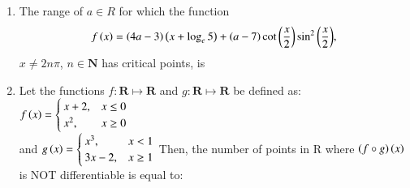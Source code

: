 \documentclass[journal]{IEEEtran}
\numberwithin{equation}{enumi}
\numberwithin{figure}{enumi}
\begin{document}
\begin{enumerate}
\begin{figure}[H]
    \end{figure}

    \item 
    The range of $a \in R$ for which the function 
    \begin{align*}
        f\left(x\right) = \left(4a - 3\right)\left(x + \log_e 5\right) + \left(a - 7\right)\cot{\ensuremath{\left(\frac{x}{2}\right)}}\sin^2{\left(\frac{x}{2}\right)},
    \end{align*}
    $x \neq 2n\pi$, $n\in\mathbf{N}$ has critical points, is

    \hfill{}
    
    \begin{enumerate}
    \end{enumerate}

    \item 
    Let the functions $f:\mathbf{R}\mapsto\mathbf{R}$ and $g:\mathbf{R}\mapsto\mathbf{R}$ be defined as:
    $f\left(x\right)=
    \begin{cases}
        x + 2, & x\leq0\\
        x^2, & x\geq0
    \end{cases}$ \\ and 
    $g\left(x\right)=
    \begin{cases}
        x^3, & x<1\\
        3x-2, & x\geq1
    \end{cases}$
    Then, the number of points in R where $\left(f\circ g\right)\left(x\right)$ is NOT differentiable is equal to: 

    \hfill{}
    
    \begin{enumerate}
    \end{enumerate}


\end{enumerate}
\end{document}
